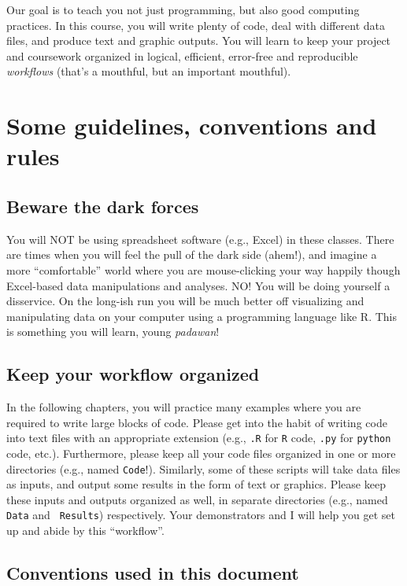 Our goal is to teach you not just programming, but also good computing 
practices. In this course, you will write plenty of code, deal with 
different data files, and produce text and graphic outputs. You will 
learn to keep your project and coursework organized in logical, 
efficient, error-free and reproducible {\it workflows} (that's a 
mouthful, but an important mouthful).

\section{Some guidelines, conventions and rules} 

\subsection{Beware the dark forces} 

You will NOT be using spreadsheet software (e.g., Excel) in these classes. 
There are times when you will feel the pull of the dark side (ahem!), 
and imagine a more ``comfortable'' world where you are 
mouse-clicking your way happily though Excel-based data manipulations 
and analyses. NO! You will be doing yourself a disservice. On the 
long-ish run you will be much better off visualizing and manipulating 
data on your computer using a programming language like R. This is something you will learn, young {\it padawan}!  

\subsection{Keep your workflow organized}
In the following chapters, you will practice many examples where you 
are required to write large blocks of code. Please get into the habit 
of writing code into text files with an appropriate extension (e.g., 
{\tt *.R} for {\tt R} code, {\tt *.py} for {\tt python} code, etc.). 
Furthermore, please keep all your code files organized in one or more 
directories (e.g., named {\tt Code}!). Similarly, some of these scripts 
will take data files as inputs, and output some results in the form of 
text or graphics. Please keep these inputs and outputs organized as 
well, in separate directories (e.g., named {\tt Data} and {\tt 
Results}) respectively. Your demonstrators and I will help you get set 
up and abide by this ``workflow''. 

\subsection{Conventions used in this document}

